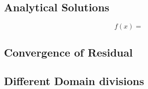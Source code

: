 
\subsection{Analytical Solutions}

		\begin{equation}
			f(x) =
		\end{equation}


		\subsection{Convergence of Residual}

		\subsection{Different Domain divisions}

